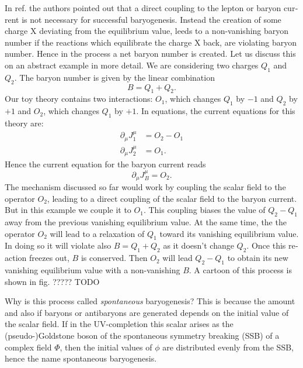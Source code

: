 \documentclass[master,       %
               twoside,        %
               BCOR10mm,       %
               english,ngerman, %
               ]{GAUBM}
\begin{document}
\begin{otherlanguage}{english}
In ref. \cite{Domcke:2020kcp_Generic_Couplings} the authors pointed out that a direct coupling to the lepton or baryon current is not necessary for successful baryogenesis.
Instead the creation of some charge X deviating from the equilibrium value, leeds to a non-vanishing baryon number if the reactions which equilibrate the charge X back, are violating baryon number. Hence in the process a net baryon number is created.
Let us discuss this on an abstract example in more detail.
We are considering two charges $Q_1$ and $Q_2$. The baryon number is given by the linear combination
\begin{equation}
	B = Q_1 + Q_2.
\end{equation}
Our toy theory contains two interactions: $O_1$, which changes $Q_1$ by $-1$ and $Q_2$ by $+1$ and $O_2$, which changes $Q_1$ by $+1$. In equations, the current equations for this theory are:
\begin{align}
	\partial_\mu J_1^\mu &= O_2 - O_1 \\
	\partial_\mu J_2^\mu &= O_1 \nonumber.
\end{align}
Hence the current equation for the baryon current reads
\begin{equation}
	\partial_\mu J_B^\mu = O_2.
\end{equation}
The mechanism discussed so far would work by coupling the scalar field to the operator $O_2$, leading to a direct coupling of the scalar field to the baryon current. But in this example we couple it to $O_1$.
This coupling biases the value of $Q_2 - Q_1$ away from the previous vanishing equilibrium value.
At the same time, the the operator $O_2$ will lead to a relaxation of $Q_1$ toward its vanishing equilibrium value. In doing so it will violate also $B = Q_1 + Q_2$ as it doesn't change $Q_2$. Once this reaction freezes out, $B$ is conserved. Then $O_2$ will lead $Q_2 - Q_1$ to obtain its new vanishing equilibrium value with a non-vanishing $B$.
A cartoon of this process is shown in fig. ????? TODO

Why is this process called \emph{spontaneous} baryogenesis?
This is because the amount and also if baryons or antibaryons are generated depends on the initial value of the scalar field.
If in the UV-completion this scalar arises as the (pseudo-)Goldstone boson of the spontaneous symmetry breaking (SSB) of a complex field $\Phi$, then the initial values of $\phi$ are distributed evenly from the SSB, hence the name spontaneous baryogenesis.


\end{otherlanguage}
\end{document}
